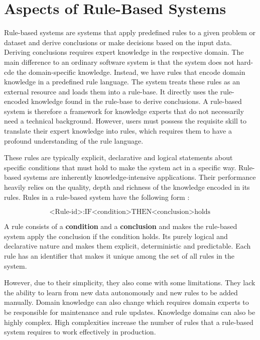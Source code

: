 \section{Aspects of Rule-Based Systems}\label{sec:aspects-of-rule-based-systems}

Rule-based systems are systems that apply predefined rules to a given problem or dataset
and derive conclusions or make decisions based on the input data\cite{grosan2011rule}.
Deriving conclusions requires expert knowledge in the respective domain.
The main difference to an ordinary software system is that the system does not hard-cde the domain-specific knowledge.
Instead, we have rules that encode domain knowledge in a predefined rule language.
The system treats these rules as an external resource and loads them into a rule-base.
It directly uses the rule-encoded knowledge found in the rule-base to derive conclusions.
A rule-based system is therefore a framework for knowledge experts that do not necessarily need a technical background.
However, users must possess the requisite skill to translate their expert knowledge into rules,
which requires them to have a profound understanding of the rule language.

These rules are typically explicit,
declarative and logical statements about specific conditions that must hold to make the system act in a specific way.
Rule-based systems are inherently knowledge-intensive applications\cite{hayes1985rule}.
Their performance heavily relies on the quality,
depth and richness of the knowledge encoded in its rules.
Rules in a rule-based system have the following form \cite{hayes1985rule}:

\[
    \text{<Rule-id>}: \text{IF} \text{<condition>} \text{THEN} \text{<conclusion>} \text{holds}
\]


A rule consists of a \textbf{condition} and a \textbf{conclusion}
and makes the rule-based system apply the conclusion if the condition holds.
Its purely logical and declarative nature and makes them explicit, deterministic and predictable.
Each rule has an identifier that makes it unique among the set of all rules in the system.

However, due to their simplicity, they also come with some limitations.
They lack the ability to learn from new data autonomously and new rules to be added manually.
Domain knowledge can also change which requires domain experts to be responsible for maintenance and rule updates.
Knowledge domains can also be highly complex.
High complexities increase the number of rules that a rule-based system requires to work effectively in production.


